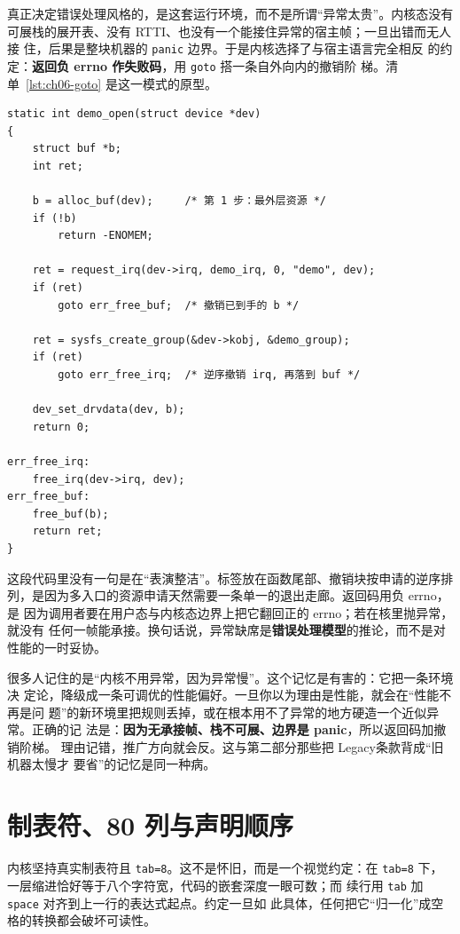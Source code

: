 \documentclass[12pt,a4paper,fontset=fandol]{ctexbook}
\newcommand{\Tp}[1]{\texttt{#1}}
\newcommand{\Lang}[1]{\textsf{#1}}
\newcommand{\DomTra}{\Lang{Legacy}}
\begin{document}
真正决定错误处理风格的，是这套运行环境，而不是所谓``异常太贵''。内核态没有
可展栈的展开表、没有 RTTI、也没有一个能接住异常的宿主帧；一旦出错而无人接
住，后果是整块机器的 \texttt{panic} 边界。于是内核选择了与宿主语言完全相反
的约定：\textbf{返回负 errno 作失败码}，用 \Tp{goto} 搭一条自外向内的撤销阶
梯。清单~\ref{lst:ch06-goto} 是这一模式的原型。

\begin{lstlisting}[style=cstyle,caption={内核式 goto 撤销阶梯：申请顺序与释放顺序严格镜像},label={lst:ch06-goto}]
static int demo_open(struct device *dev)
{
	struct buf *b;
	int ret;

	b = alloc_buf(dev);		/* 第 1 步：最外层资源 */
	if (!b)
		return -ENOMEM;

	ret = request_irq(dev->irq, demo_irq, 0, "demo", dev);
	if (ret)
		goto err_free_buf;	/* 撤销已到手的 b */

	ret = sysfs_create_group(&dev->kobj, &demo_group);
	if (ret)
		goto err_free_irq;	/* 逆序撤销 irq, 再落到 buf */

	dev_set_drvdata(dev, b);
	return 0;

err_free_irq:
	free_irq(dev->irq, dev);
err_free_buf:
	free_buf(b);
	return ret;
}
\end{lstlisting}

这段代码里没有一句是在``表演整洁''。标签放在函数尾部、撤销块按申请的逆序排
列，是因为多入口的资源申请天然需要一条单一的退出走廊。返回码用负 errno，是
因为调用者要在用户态与内核态边界上把它翻回正的 errno；若在核里抛异常，就没有
任何一帧能承接。换句话说，异常缺席是\textbf{错误处理模型}的推论，而不是对
性能的一时妥协。

\begin{warning}[title={把``约束''错记成``性能建议''，会推广出错误的规则}]
很多人记住的是``内核不用异常，因为异常慢''。这个记忆是有害的：它把一条环境决
定论，降级成一条可调优的性能偏好。一旦你以为理由是性能，就会在``性能不再是问
题''的新环境里把规则丢掉，或在根本用不了异常的地方硬造一个近似异常。正确的记
法是：\textbf{因为无承接帧、栈不可展、边界是 panic}，所以返回码加撤销阶梯。
理由记错，推广方向就会反。这与第二部分那些把 \DomTra 条款背成``旧机器太慢才
要省''的记忆是同一种病。
\end{warning}

\section{制表符、80 列与声明顺序}
\label{sec:ch06-tabs}

内核坚持真实制表符且 \texttt{tab=8}。这不是怀旧，而是一个视觉约定：在
\texttt{tab=8} 下，一层缩进恰好等于八个字符宽，代码的嵌套深度一眼可数；而
续行用 \texttt{tab} 加 \texttt{space} 对齐到上一行的表达式起点。约定一旦如
此具体，任何把它``归一化''成空格的转换都会破坏可读性。
\end{document}
